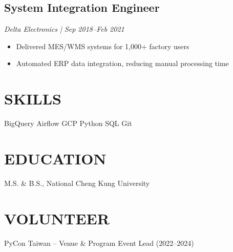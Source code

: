 \documentclass[a4paper,11pt]{article}
\begin{document}
\subsection*{System Integration Engineer}
\textit{\color{gray}Delta Electronics | Sep 2018–Feb 2021}
\begin{itemize}
    \item Delivered MES/WMS systems for 1,000+ factory users
    \item Automated ERP data integration, reducing manual processing time
\end{itemize}

\section*{SKILLS}
BigQuery \quad Airflow \quad GCP \quad Python \quad SQL \quad Git

\section*{EDUCATION}
M.S. \& B.S., National Cheng Kung University

\section*{VOLUNTEER}
PyCon Taiwan – Venue \& Program Event Lead (2022–2024)
\end{document}
